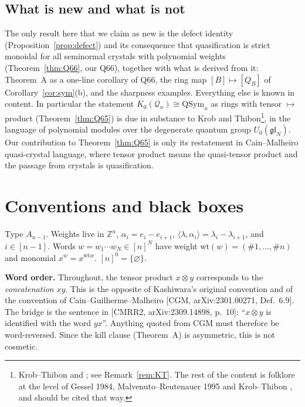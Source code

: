 \documentclass[11pt]{amsart}
\theoremstyle{definition}
\theoremstyle{remark}
\newcommand{\wt}{\mathrm{wt}}
\newcommand{\QSym}{\mathrm{QSym}}
\newcommand{\cQ}{\mathcal{Q}}
\begin{document}
\subsection*{What is new and what is not}
The only result here that we claim as new is the defect identity (Proposition~\ref{prop:defect}) and its consequence that quasification is strict monoidal for all seminormal crystals with polynomial weights (Theorem~\ref{thm:Q66}, our Q66), together with what is derived from it: Theorem~A as a one-line corollary of Q66, the ring map $[B]\mapsto[Q_B]$ of Corollary~\ref{cor:sym}(b), and the sharpness examples. Everything else is known in content. In particular the statement $K_0(\cQ_n)\cong\QSym_n$ as rings with tensor $\mapsto$ product (Theorem~\ref{thm:Q65}) is due in substance to Krob and Thibon\footnote{Krob--Thibon \cite[Prop.~6.1, Conj.~6.13, Note~6.14]{KT4} and \cite[Props.~7.1, 7.3 and the closing remark of \S7]{KT5}; see Remark~\ref{rem:KT}. The rest of the content is folklore at the level of Gessel 1984, Malvenuto--Reutenauer 1995 and Krob--Thibon \cite{KT4,KT5}, and should be cited that way.}, in the language of polynomial modules over the degenerate quantum group $U_0(\mathfrak{gl}_N)$. Our contribution to Theorem~\ref{thm:Q65} is only its restatement in Cain--Malheiro quasi-crystal language, where tensor product means the quasi-tensor product and the passage from crystals is quasification.

\newpage
\tableofcontents

\section{Conventions and black boxes}

Type $A_{n-1}$. Weights live in $\mathbb Z^n$, $\alpha_i=e_i-e_{i+1}$, $\langle\lambda,\alpha_i\rangle=\lambda_i-\lambda_{i+1}$, and $i\in[n-1]$. Words $w=w_1\cdots w_N\in[n]^N$ have weight $\wt(w)=(\#1,\dots,\#n)$ and monomial $x^w=x^{\wt w}$. $[n]^0=\{\varnothing\}$.

\textbf{Word order.} Throughout, the tensor product $x\otimes y$ corresponds to the \emph{concatenation} $xy$. This is the opposite of Kashiwara's original convention and of the convention of Cain--Guilherme--Malheiro [CGM, arXiv:2301.00271, Def.~6.9]. The bridge is the sentence in [CMRR2, arXiv:2309.14898, p.~10]: ``$x\ddot\otimes y$ is identified with the word $yx$''. Anything quoted from CGM must therefore be word-reversed. Since the kill clause (Theorem~A) is asymmetric, this is not cosmetic.
\end{document}
